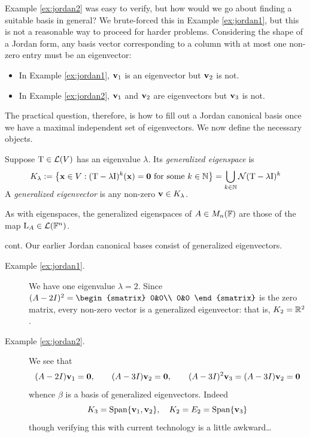 
Example \ref{ex:jordan2} was easy to verify, but how would we go about finding a suitable basis in general? We brute-forced this in Example \ref{ex:jordan1}, but this is not a reasonable way to proceed for harder problems. Considering the shape of a Jordan form, any basis vector corresponding to a column with at most one non-zero entry must be an eigenvector:
\begin{itemize}
  \item In Example \ref{ex:jordan1}, ${\mathbf{v}}_1$ is an eigenvector but ${\mathbf{v}}_2$ is not.
  \item In Example \ref{ex:jordan2}, ${\mathbf{v}}_1$ and ${\mathbf{v}}_2$ are eigenvectors but ${\mathbf{v}}_3$ is not.
\end{itemize}
The practical question, therefore, is how to fill out a Jordan canonical basis once we have a maximal independent set of eigenvectors. We now define the necessary objects.

\begin{defn}{}{}
	Suppose $\mathrm{T}\in\mathcal{L}(V)$ has an eigenvalue $\lambda$. Its \emph{generalized eigenspace} is
	\[
		K_\lambda:=
		\big\{{\mathbf{x}}\in V:(\mathrm{T}-\lambda \mathrm{I})^k({\mathbf{x}})=\mathbf{0}\text{ for some }k\in\mathbb{N}\big\}
		=\smash[b]{\bigcup_{k\in\mathbb{N}}\mathcal{N}(\mathrm{T}-\lambda\mathrm{I})^k}
	\]
	A \emph{generalized eigenvector} is any non-zero ${\mathbf{v}}\in K_\lambda$.
\end{defn}

As with eigenspaces, the generalized eigenspaces of $A\in M_n(\mathbb{F})$ are those of the map $\mathrm{L}_A\in\mathcal{L}(\mathbb{F}^n)$.\smallbreak

\begin{examples*}{cont.}{}
	Our earlier Jordan canonical bases consist of generalized eigenvectors.
	\begin{description}
	  \item[{Example \ref{ex:jordan1}}.] We have one eigenvalue $\lambda=2$. Since $(A-2I)^2=
	  \begin{smatrix}
	  	0&0\\
	  	0&0
	  \end{smatrix}$
	  is the zero matrix, every non-zero vector is a generalized eigenvector: that is, $K_2=\mathbb{R}^2$.
	
	  \item[Example \ref{ex:jordan2}.] We see that
	  \[
	  	(A-2I){\mathbf{v}}_1=\mathbf{0},\qquad 
	  	(A-3I){\mathbf{v}}_2=\mathbf{0},\qquad 
	  	(A-3I)^2{\mathbf{v}}_3=(A-3I){\mathbf{v}}_2=\mathbf{0}
	  \]
	  whence $\beta$ is a basis of generalized eigenvectors. Indeed
	  \[
	  	K_3=\operatorname{Span}\{{\mathbf{v}}_1,{\mathbf{v}}_2\},\quad 
	  	K_2=E_2=\operatorname{Span}\{{\mathbf{v}}_3\}
	  \]
	  though verifying this with current technology is a little awkward\ldots
	\end{description}
\end{examples*}


